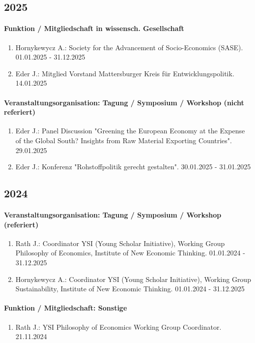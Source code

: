 \subsection*{2025} 
\paragraph{Funktion / Mitgliedschaft in wissensch. Gesellschaft} 
\begin{enumerate}[leftmargin=*, labelsep=0.5cm] 
 	 \item Hornykewycz A.: Society for the Advancement of Socio-Economics (SASE). 01.01.2025 - 31.12.2025 
	 \item Eder J.: Mitglied Vorstand Mattersburger Kreis für Entwicklungspolitik. 14.01.2025 
\end{enumerate} 
\paragraph{Veranstaltungsorganisation: Tagung / Symposium / Workshop (nicht referiert)} 
\begin{enumerate}[leftmargin=*, labelsep=0.5cm] 
 	 \item Eder J.: Panel Discussion "Greening the European Economy at the Expense of the Global South? Insights from Raw Material Exporting Countries". 29.01.2025 
	 \item Eder J.: Konferenz "Rohstoffpolitik gerecht gestalten". 30.01.2025 - 31.01.2025 
\end{enumerate} 
\subsection*{2024} 
\paragraph{Veranstaltungsorganisation: Tagung / Symposium / Workshop (referiert)} 
\begin{enumerate}[leftmargin=*, labelsep=0.5cm] 
 	 \item Rath J.: Coordinator YSI (Young Scholar Initiative), Working Group Philosophy of Economics,  Institute of New Economic Thinking. 01.01.2024 - 31.12.2025 
	 \item Hornykewycz A.: Coordinator YSI (Young Scholar Initiative), Working Group Sustainability, Institute of New Economic Thinking. 01.01.2024 - 31.12.2025 
\end{enumerate} 
\paragraph{Funktion / Mitgliedschaft: Sonstige} 
\begin{enumerate}[leftmargin=*, labelsep=0.5cm] 
 	 \item Rath J.: YSI Philosophy of Economics Working Group Coordinator. 21.11.2024 
\end{enumerate} 
